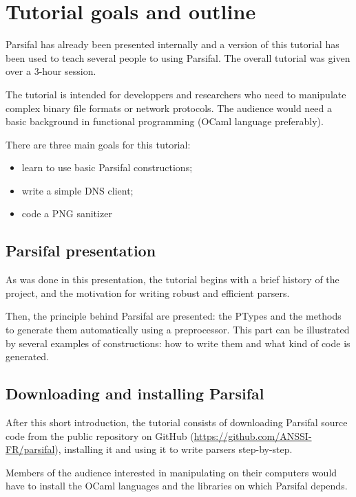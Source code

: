 \documentclass{article}
\begin{document}
\section{Tutorial goals and outline}

Parsifal has already been presented internally and a version of this
tutorial has been used to teach several people to using Parsifal. The
overall tutorial was given over a 3-hour session.

The tutorial is intended for developpers and researchers who need to
manipulate complex binary file formats or network protocols. The
audience would need a basic background in functional programming
(OCaml language preferably).

There are three main goals for this tutorial:
\begin{itemize}
\item learn to use basic Parsifal constructions;
\item write a simple DNS client;
\item code a PNG sanitizer
\end{itemize}


\subsection{Parsifal presentation}

As was done in this presentation, the tutorial begins with a brief
history of the project, and the motivation for writing robust and
efficient parsers.

Then, the principle behind Parsifal are presented: the PTypes and the
methods to generate them automatically using a preprocessor. This part
can be illustrated by several examples of constructions: how to write
them and what kind of code is generated.


\subsection{Downloading and installing Parsifal}

After this short introduction, the tutorial consists of downloading
Parsifal source code from the public repository on GitHub
(\url{https://github.com/ANSSI-FR/parsifal}), installing it and using
it to write parsers step-by-step.

Members of the audience interested in manipulating on their
computers would have to install the OCaml languages and the libraries
on which Parsifal depends.
\end{document}
